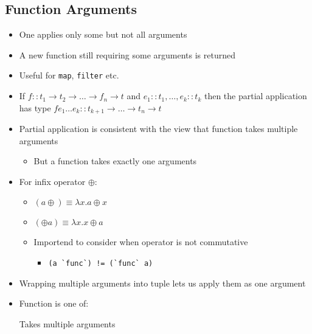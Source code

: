 \subsection{Function Arguments}
\begin{itemize}
        \begin{itemize}
            \item One applies only some but not all arguments
            \item A new function still requiring some arguments is returned
            \item Useful for \verb+map+, \verb+filter+ etc.
            \item If $f :: t_1 \to t_2 \to \dots \to f_n \to t$ and $e_1 :: t_1, \dots , e_k :: t_k$ then the partial application has type $f e_1 \dots e_k :: t_{k + 1} \to \dots \to t_n \to t$
            \item Partial application is consistent with the view that function takes multiple arguments
                \begin{itemize}
                    \item But a function takes exactly one arguments
                \end{itemize}
            \item For infix operator $\oplus$:
                \begin{itemize}
                    \item $(a \oplus) \equiv \lambda x. a \oplus x$
                    \item $(\oplus a) \equiv \lambda x. x \oplus a$
                    \item Importend to consider when operator is not commutative
                        \begin{itemize}
                            \item \verb+(a `func`) != (`func` a)+
                        \end{itemize}
                \end{itemize}
        \end{itemize}
        \begin{itemize}
            \item Wrapping multiple arguments into tuple lets us apply them as one argument
            \item Function is one of:
                \begin{itemize}
                     Takes multiple arguments

\end{itemize}
\end{itemize}
\end{itemize}
